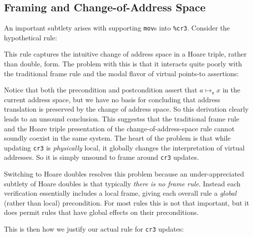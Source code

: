 \documentclass[acmsmall]{acmart}
\begin{document}
\begin{appendix}
\section{Framing and Change-of-Address Space}
An important subtlety arises with supporting \lstinline|mov|s into \lstinline|%cr3|. Consider the hypothetical rule:
\begin{mathpar}
\end{mathpar}
This rule captures the intuitive change of address space in a Hoare triple, rather than double, form. The problem with this is that it interacts quite poorly with the traditional frame rule and the modal flavor of virtual points-to assertions:
\begin{mathpar}
\end{mathpar}
Notice that both the precondition and postcondition assert that $a\mapsto_\mathsf{v} x$ in the current address space, but we have no basis for concluding that address translation is preserved by the change of address space. So this derivation clearly leads to an unsound conclusion. This suggestss that the traditional frame rule and the Hoare triple presentation of the change-of-address-space rule cannot soundly coexist in the same system.
The heart of the problem is that while updating \lstinline|cr3| is \emph{physically} local, it globally changes the interpretation of virtual addresses. So it is simply unsound to frame around \lstinline|cr3| updates.

Switching to Hoare doubles resolves this problem because an under-appreciated subtlety of Hoare doubles is that typically \emph{there is no frame rule}. Instead each verification essentially includes a local frame, giving each overall rule a \emph{global} (rather than local) precondition. For most rules this is not that important, but it does permit rules that have global effects on their preconditions.

This is then how we justify our actual rule for \lstinline|cr3| updates:
\begin{mathpar}
\end{mathpar}

\end{appendix}
\end{document}
